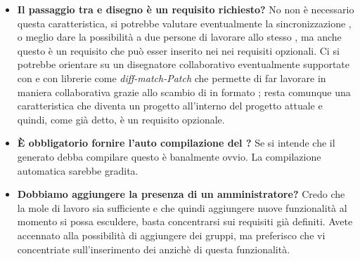 \begin{itemize}
\\
	  		   	\item 
	   		\textbf{Il passaggio tra  e disegno è un requisito richiesto?}
	    	\justifying     		
No non è necessario questa caratteristica, si potrebbe valutare eventualmente la sincronizzazione , o meglio dare la possibilità a due persone di lavorare allo stesso  , ma anche questo è  un requisito che può esser inserito nei nei requisiti opzionali. Ci si potrebbe orientare su un disegnatore collaborativo eventualmente supportate con  e con librerie come \emph{diff-match-Patch} che permette di far lavorare in maniera collaborativa grazie allo scambio di  in formato ; resta comunque una caratteristica che diventa un progetto all'interno del progetto attuale e quindi, come già detto, è un requisito opzionale.
\\

	  		   	\item 
	   		\textbf{È obbligatorio fornire l'auto compilazione del ?}
	    	\justifying     		
Se si intende che il  generato debba compilare questo è banalmente ovvio. La compilazione automatica sarebbe gradita.
\\
		  		   	\item 
	   		\textbf{Dobbiamo aggiungere la presenza di un  amministratore?}
	    	\justifying     		
Credo che la mole di lavoro sia sufficiente e che quindi aggiungere nuove funzionalità al momento si possa esculdere, basta concentrarsi sui requisiti già definiti. Avete accennato alla possibilità di aggiungere dei gruppi, ma preferisco che vi concentriate sull'inserimento dei  anzichè di questa funzionalità.
\\
	   	 \end{itemize}
